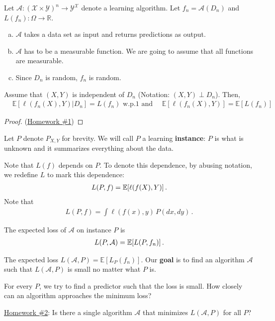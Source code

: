 \documentclass[twoside]{article}
\begin{document}
\begin{definition}
    Let $\mathcal{A}: (\mathcal{X}\times \mathcal{Y})^n \rightarrow \mathcal{Y}^\mathcal{X}$ denote a learning algorithm. Let $f_n=\mathcal{A}(D_n)$ and $L(f_n): \Omega \rightarrow \mathbb{R}$.
\end{definition}

\begin{remark}\mbox{}
\begin{enumerate}[(a)]
\item  $\mathcal{A}$ takes a data set as input and returns predictions as output.
\item $\mathcal{A}$ has to be a measurable function. We are going to assume that all functions are measurable. 
\item Since $D_n$ is random, $f_n$ is random.
\end{enumerate}
\end{remark}


\begin{proposition} 
Assume that $(X,Y)$ is independent of $D_n$ (Notation: $(X,Y) \perp D_n$). Then,
\begin{align*}
    & \mathbb{E}[ \ell \left( f_n(X),Y \right) | D_n ] = L(f_n)\text{ w.p.1  and } \quad
    \mathbb{E}[ \ell \left( f_n(X),Y \right) ] = \mathbb{E} [L(f_n)]\,
\end{align*}
\end{proposition}
\begin{proof}
    (\underline{Homework \#1})
\end{proof}

Let $P$ denote $P_{X,Y}$ for brevity. We will call $P$ a learning \textbf{instance}: $P$ is what is unknown and it summarizes everything about the data.

Note that $L(f)$ depends on $P$. To denote this dependence, by abusing notation, we redefine
$L$ to mark this dependence:
\begin{align*}
L(P,f) = \mathbb{E}[ \ell(f(X),Y) ]\,.
\end{align*}
Note that
\begin{align*}
L(P,f) = \int \ell(f(x),y) \, P(dx,dy)\,.
\end{align*}

\begin{definition}
The expected loss  of $\mathcal{A}$ on instance $P$ is 
\begin{align*}
L(P,\mathcal{A} ) = \mathbb{E}[L(P,f_n)]\,.
\end{align*}
\end{definition}

The expected loss $L(\mathcal{A},P ) = \mathbb{E} [L_{P }(f_n)]$. 
Our {\bf goal} is to find an algorithm $\mathcal{A}$ such that $L(\mathcal{A}, P )$ is small no matter what $P$ is.

For every $P$, we try to find a predictor such that the loss is small. How closely can an algorithm approaches the minimum loss?

\noindent 
\underline{Homework \#2}: Is there a single algorithm $\mathcal{A}$ that minimizes $L(\mathcal{A},P)$ for all $P$?
\end{document}

